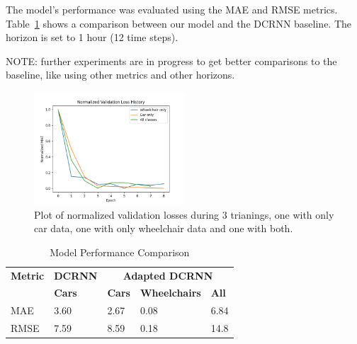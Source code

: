 The model's performance was evaluated using the MAE and RMSE metrics.
Table~\ref{tab:model_performance_comparison} shows a comparison between our model and the DCRNN baseline.
The horizon is set to 1 hour (12 time steps).

NOTE: further experiments are in progress to get better comparisons to the baseline, like using other metrics and other horizons.

\begin{figure}[htbp]
    \centering
    \includegraphics[width=0.5\textwidth]{resources/normalized_val_losses}
    \caption{
        Plot of normalized validation losses during 3 trianings, one with only car data, one with only wheelchair data and one with both.
    }
    \label{fig:normalized_val_losses}
\end{figure}

\begin{table}[htbp]
    \caption{Model Performance Comparison}
    \center
    \begin{tabular}{@{}lllll@{}}
        \toprule
        \textbf{Metric} & \textbf{DCRNN} & \multicolumn{3}{c}{\textbf{Adapted DCRNN}} \\
        & \textbf{Cars} & \textbf{Cars} & \textbf{Wheelchairs} & \textbf{All} \\
        \midrule
        MAE  & 3.60          & 2.67          & 0.08                 & 6.84         \\
        RMSE & 7.59          & 8.59          & 0.18                 & 14.8         \\
        \bottomrule
    \end{tabular}
    \label{tab:model_performance_comparison}
\end{table}